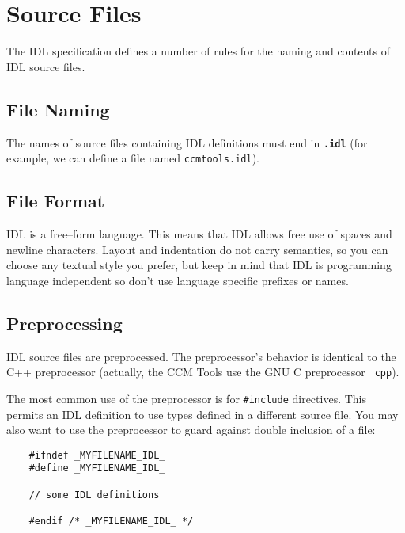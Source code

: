 \section{Source Files}
The IDL specification defines a number of rules for the naming and contents of
IDL source files.

\subsection{File Naming}
The names of source files containing IDL definitions must end in {\bf \tt .idl}
(for example, we can define a file named {\tt ccmtools.idl}).

\subsection{File Format}
IDL is a free--form language. This means that IDL allows free use of spaces
and newline characters.
Layout and indentation do not carry semantics, so you can choose any textual
style you prefer, but keep in mind that IDL is programming language independent
so don't use language specific prefixes or names.
 

\subsection{Preprocessing}
IDL source files are preprocessed. The preprocessor's behavior is identical to
the C++ preprocessor (actually, the CCM Tools use the GNU C preprocessor {\tt 
cpp}).

The most common use of the preprocessor is for {\tt \#include} directives. This
permits an IDL definition to use types defined in a different source file.
You may also want to use the preprocessor to guard against double inclusion of a
file:
\begin{verbatim}
    #ifndef _MYFILENAME_IDL_
    #define _MYFILENAME_IDL_
    
    // some IDL definitions

    #endif /* _MYFILENAME_IDL_ */
\end{verbatim}


